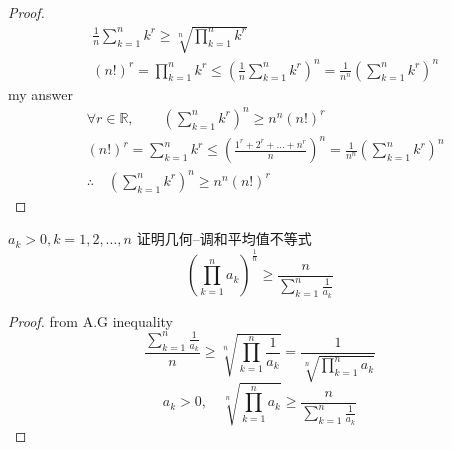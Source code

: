\begin{example}
\begin{proof}
\begin{align*}
			&\frac{1}{n}\sum_{k=1}^n k^r \ge \sqrt[n]{\prod_{k=1}^n k^r}\\
			&(n!)^r =\prod_{k=1}^n k^r \le (\frac{1}{n}\sum_{k=1}^n k^r)^n = \frac{1}{n^n}(\sum_{k=1}^n k^r)^n 
		\end{align*}
	my answer
	\begin{align*}
		&\forall r\in \mathbb{R},\qquad(\sum_{k=1}^n k^r)^n \ge n^n(n!)^r\\
		&(n!)^r = \sum_{k=1}^n k^r \le (\frac{1^r+2^r+\dots+n^r}{n})^n = \frac{1}{n^n}(\sum_{k=1}^n k^r)^n\\
		&\therefore\quad (\sum_{k=1}^n k^r)^n \ge n^n(n!)^r
 	\end{align*}
	\end{proof}
\end{example}

\begin{example}
	$ a_k>0, k = 1,2,\dots,n$ 证明几何--调和平均值不等式
	\[(\prod_{k=1}^n a_k)^{\frac{1}{n}} \ge \frac{n}{\sum_{k=1}^n\frac{1}{a_k}}\]
	\begin{proof}
		from A.G inequality
		\[\frac{\sum_{k=1}^n\frac{1}{a_k}}{n} \ge \sqrt[n]{\prod_{k=1}^n \frac{1}{a_k}} = \frac{1}{\sqrt[n]{\prod_{k=1}^n a_k}}\]
		\[a_k>0, \quad \sqrt[n]{\prod_{k=1}^n {a_k}} \ge  \frac{n}{\sum_{k=1}^n\frac{1}{a_k}} \]
	\end{proof}
\end{example}

